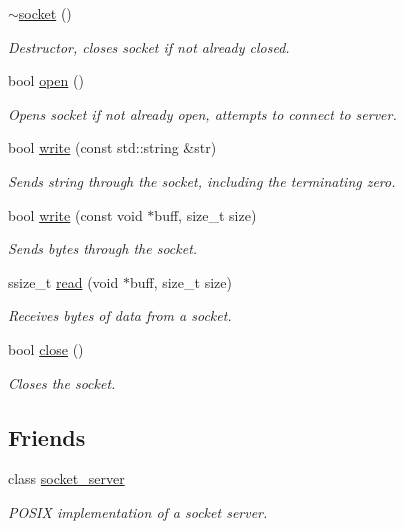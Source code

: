 \begin{DoxyCompactItemize}
\hyperlink{classcpen333_1_1process_1_1posix_1_1socket_ad5dc9ffd6311247114538ec84f2c08a0}{$\sim$socket} ()
\begin{DoxyCompactList}\small\item\em Destructor, closes socket if not already closed. \end{DoxyCompactList}\item 
bool \hyperlink{classcpen333_1_1process_1_1posix_1_1socket_a0ac2e0452989cca9e6279602a8d73854}{open} ()
\begin{DoxyCompactList}\small\item\em Opens socket if not already open, attempts to connect to server. \end{DoxyCompactList}\item 
bool \hyperlink{classcpen333_1_1process_1_1posix_1_1socket_a80d3d77a066ebc082196bb2182021818}{write} (const std\+::string \&str)
\begin{DoxyCompactList}\small\item\em Sends string through the socket, including the terminating zero. \end{DoxyCompactList}\item 
bool \hyperlink{classcpen333_1_1process_1_1posix_1_1socket_a60ba24c07c24cfb34ef77b0f137cfc32}{write} (const void $\ast$buff, size\+\_\+t size)
\begin{DoxyCompactList}\small\item\em Sends bytes through the socket. \end{DoxyCompactList}\item 
ssize\+\_\+t \hyperlink{classcpen333_1_1process_1_1posix_1_1socket_aaadcd25ad297fc3ca9199f06a5ba7cc8}{read} (void $\ast$buff, size\+\_\+t size)
\begin{DoxyCompactList}\small\item\em Receives bytes of data from a socket. \end{DoxyCompactList}\item 
bool \hyperlink{classcpen333_1_1process_1_1posix_1_1socket_a37ac1c8f8ba6dec89066dc1721d0bb0c}{close} ()
\begin{DoxyCompactList}\small\item\em Closes the socket. \end{DoxyCompactList}\end{DoxyCompactItemize}
\subsection*{Friends}
\begin{DoxyCompactItemize}
\item 
class \hyperlink{classcpen333_1_1process_1_1posix_1_1socket_aba37c0ea463da9263b0712d3b3389066}{socket\+\_\+server}
\begin{DoxyCompactList}\small\item\em P\+O\+S\+IX implementation of a socket server. \end{DoxyCompactList}\end{DoxyCompactItemize}


